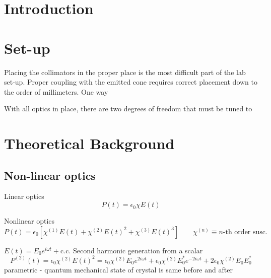 \documentclass{article}
\begin{document}
\maketitle


\begin{tocbox}
	\tableofcontents
\end{tocbox}

\section{Introduction}

\section{Set-up}
Placing the collimators in the proper place is the most difficult part of the 
lab set-up. Proper coupling with the emitted cone requires correct placement 
down to the order of millimeters. One way 

With all optics in place, there are two degrees of freedom that must be tuned 
to 


\section{Theoretical Background}
\subsection{Non-linear optics}
Linear optics 
\begin{equation*}
  P(t) = \epsilon_0 \chi E(t)
\end{equation*}

Nonlinear optics 
\begin{equation*}
  P(t) = \epsilon_0 \left[
    \chi^{(1)} E(t) 
    + \chi^{(2)} E(t)^2
    + \chi^{(3)} E(t)^3
    \right]\qquad 
    \chi^{(n)} \equiv n\text{-th order susc.}
\end{equation*}

$ E(t) = E_0 e^{i\omega t} + \text{c.c.} $
Second harmonic generation from a scalar
\begin{equation*}
  P^{(2)} (t) = \epsilon_0 \chi^{(2)}E(t)^2
    = \epsilon_0 \chi^{(2)} E_0 e^{2i\omega t}
      + \epsilon_0 \chi^{(2)} E_0^\ast e^{-2i\omega t}
        + 2\epsilon_0 \chi^{(2)} E_0 E_0^\ast
\end{equation*}
parametric - quantum mechanical state of crystal is same before and after

\nocite{*}
\printbibliography[title=Bibliography]
\end{document}
